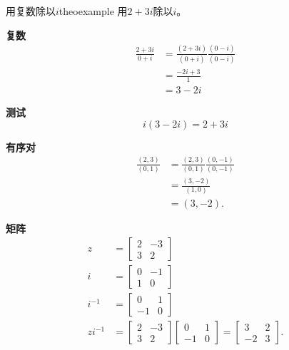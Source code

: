 \begin{myexample}{用复数除以\boldmath$i$}{theoexample}
用$2+3 i$除以$i$。

\textbf{复数}
$$
  \begin{aligned}
    \frac{2+3 i}{0+i} & =\frac{(2+3 i)}{(0+i)} \frac{(0-i)}{(0-i)} \\
                      & =\frac{-2 i+3}{1}                          \\
                      & =3-2 i
  \end{aligned}
$$

\textbf{测试}
$$
  i(3-2 i)=2+3 i
$$

\textbf{有序对}
$$
  \begin{aligned}
    \frac{(2,3)}{(0,1)} & =\frac{(2,3)}{(0,1)} \frac{(0,-1)}{(0,-1)} \\
                        & =\frac{(3,-2)}{(1,0)}                      \\
                        & =(3,-2) .
  \end{aligned}
$$

\textbf{矩阵}
$$
  \begin{aligned}
    z        & =\left[\begin{array}{cc}
        2 & -3 \\
        3 & 2
      \end{array}\right]                                                                                    \\
    i        & =\left[\begin{array}{cc}
        0 & -1 \\
        1 & 0
      \end{array}\right]                                                                                    \\
    i^{-1}   & =\left[\begin{array}{cc}
        0  & 1 \\
        -1 & 0
      \end{array}\right]                                                                                    \\
    z i^{-1} & =\left[\begin{array}{ll}
        2 & -3 \\
        3 & 2
      \end{array}\right]\left[\begin{array}{cc}
        0  & 1 \\
        -1 & 0
      \end{array}\right]=\left[\begin{array}{cc}
        3  & 2 \\
        -2 & 3
      \end{array}\right] .
  \end{aligned}
$$
\end{myexample}


